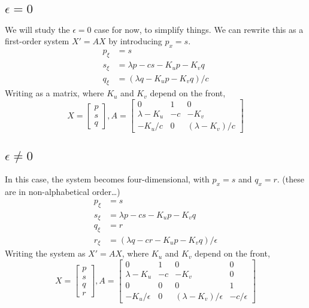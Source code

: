 \documentclass[10pt]{article}
\begin{document}
\subsection{$\epsilon = 0$}
We will study the $\epsilon=0$ case for now, to simplify things.
We can rewrite this as a first-order system $X' = AX$ by introducing $p_x = s$.
\begin{align}
p_\xi &= s \\
s_\xi &= \lambda p - c s - K_u p - K_v q \\
q_\xi &= (\lambda q - K_u p - K_v q)/c
\end{align}
Writing as a matrix, where $K_u$ and $K_v$ depend on the front,
\[
X = \begin{bmatrix}p\\s\\q\end{bmatrix},
A = \begin{bmatrix}
0 & 1 & 0 \\
\lambda - K_u  &  -c  &  -K_v \\
- K_u/c  &  0  &  (\lambda - K_v)/c
\end{bmatrix}
\]

\subsection{$\epsilon \neq 0$}
In this case, the system becomes four-dimensional, with $p_x = s$ and $q_x = r$.
(these are in non-alphabetical order\ldots)
\begin{align}
p_\xi &= s \\
s_\xi &= \lambda p - c s - K_u p - K_v q \\
q_\xi &= r \\
r_\xi &= (\lambda q - c r - K_u p - K_v q)/\epsilon
\end{align}
Writing the system as $X' = AX$, where $K_u$ and $K_v$ depend on the front,
\[
X = \begin{bmatrix}p\\s\\q\\r\end{bmatrix},
A = \begin{bmatrix}
0 & 1 & 0 & 0 \\
\lambda - K_u  &  -c  &  -K_v  & 0 \\
0 & 0 & 0 & 1 \\
- K_u/\epsilon &  0  &  (\lambda - K_v)/\epsilon  &  - c / \epsilon
\end{bmatrix}
\]
\end{document}
